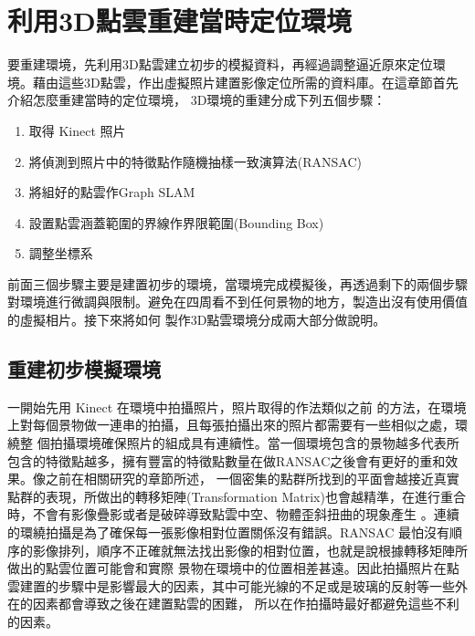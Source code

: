 % 
\section{利用3D點雲重建當時定位環境}

   要重建環境，先利用3D點雲建立初步的模擬資料，再經過調整逼近原來定位環境。藉由這些3D點雲，作出虛擬照片建置影像定位所需的資料庫。在這章節首先介紹怎麼重建當時的定位環境，
   3D環境的重建分成下列五個步驟：

\begin{enumerate}
	\item 取得 Kinect 照片
    \item 將偵測到照片中的特徵點作隨機抽樣一致演算法(RANSAC)
    \item 將組好的點雲作Graph SLAM
    \item 設置點雲涵蓋範圍的界線作界限範圍(Bounding Box)
    \item 調整坐標系
\end{enumerate}  
   
   前面三個步驟主要是建置初步的環境，當環境完成模擬後，再透過剩下的兩個步驟對環境進行微調與限制。避免在四周看不到任何景物的地方，製造出沒有使用價值的虛擬相片。接下來將如何
   製作3D點雲環境分成兩大部分做說明。
   
%
\subsection{重建初步模擬環境}
   一開始先用 Kinect 在環境中拍攝照片，照片取得的作法類似之前 \cite{Du2011}的方法，在環境上對每個景物做一連串的拍攝，且每張拍攝出來的照片都需要有一些相似之處，環繞整
   個拍攝環境確保照片的組成具有連續性。當一個環境包含的景物越多代表所包含的特徵點越多，擁有豐富的特徵點數量在做RANSAC之後會有更好的重和效果。像之前在相關研究的章節所述，
   一個密集的點群所找到的平面會越接近真實點群的表現，所做出的轉移矩陣(Transformation Matrix)也會越精準，在進行重合時，不會有影像疊影或者是破碎導致點雲中空、物體歪斜扭曲的現象產生
   。連續的環繞拍攝是為了確保每一張影像相對位置關係沒有錯誤。RANSAC 最怕沒有順序的影像排列，順序不正確就無法找出影像的相對位置，也就是說根據轉移矩陣所做出的點雲位置可能會和實際
   景物在環境中的位置相差甚遠。因此拍攝照片在點雲建置的步驟中是影響最大的因素，其中可能光線的不足或是玻璃的反射等一些外在的因素都會導致之後在建置點雲的困難，
   所以在作拍攝時最好都避免這些不利的因素。
     
